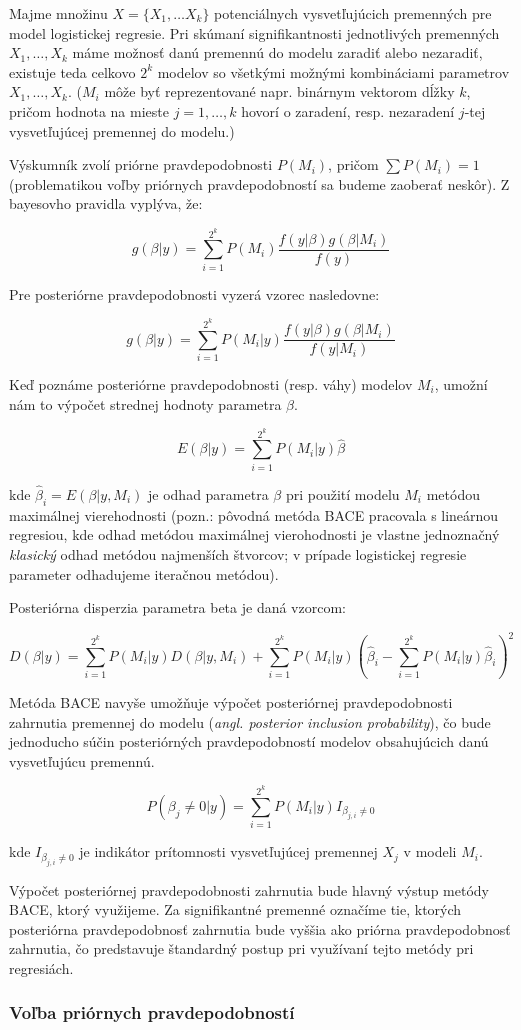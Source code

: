 Majme množinu \( X = \{X_1, \ldots X_k\} \) potenciálnych vysvetľujúcich premenných pre model logistickej regresie.
Pri skúmaní signifikantnosti jednotlivých premenných \( X_1, \ldots, X_k \) máme možnosť danú premennú do modelu zaradiť alebo nezaradiť,
existuje teda celkovo \( 2^k \) modelov so všetkými možnými kombináciami parametrov \( X_1, \ldots, X_k \).
(\( M_i \) môže byť reprezentované napr. binárnym vektorom dĺžky \(k\), pričom hodnota na mieste \( j = 1, \ldots, k \) hovorí o zaradení, resp. nezaradení \(j\)-tej vysvetľujúcej premennej do modelu.)

Výskumník zvolí priórne pravdepodobnosti \( P(M_i) \), pričom \( \sum P(M_i) = 1 \) (problematikou voľby priórnych pravdepodobností sa budeme zaoberať neskôr).
Z bayesovho pravidla vyplýva, že:

\[
    g(\beta | y) = \sum_{i = 1}^{2^k} P(M_i) \frac{f(y | \beta) g(\beta | M_i)}{f(y)}
\]

Pre posteriórne pravdepodobnosti vyzerá vzorec nasledovne:

\[
    g(\beta | y) = \sum_{i = 1}^{2^k} P(M_i | y) \frac{f(y | \beta) g(\beta | M_i)}{f(y | M_i)}
\]

Keď poznáme posteriórne pravdepodobnosti (resp. váhy) modelov \( M_i \), umožní nám to výpočet strednej hodnoty parametra \( \beta \).

\[
    E(\beta | y) = \sum_{i = 1}^{2^k} P(M_i | y) \hat{\beta}
\]

kde \( \hat{\beta}_i = E(\beta |y, M_i) \) je odhad parametra \( \beta \) pri použití modelu \( M_i \) metódou maximálnej vierehodnosti
(pozn.: pôvodná metóda BACE pracovala s lineárnou regresiou, kde odhad metódou maximálnej vierohodnosti je vlastne jednoznačný \emph{klasický} odhad metódou najmenších štvorcov;
v prípade logistickej regresie parameter odhadujeme iteračnou metódou).

Posteriórna disperzia parametra beta je daná vzorcom:

\[
    D(\beta | y) = \sum_{i = 1}^{2^k} P(M_i | y) D(\beta | y, M_i) + \sum_{i = 1}^{2^k} P(M_i | y) \left( \hat{\beta}_i - \sum_{i = 1}^{2^k} P(M_i | y) \hat{\beta}_i \right)^2
\]

Metóda BACE navyše umožňuje výpočet posteriórnej pravdepodobnosti zahrnutia premennej do modelu (\emph{angl. posterior inclusion probability}),
čo bude jednoducho súčin posteriórných pravdepodobností modelov obsahujúcich danú vysvetľujúcu premennú.

\[
    P(\beta_j \neq 0 | y) = \sum_{i = 1}^{2^k} P(M_i | y) I_{\beta_{j, i} \neq 0}
\]

kde \( I_{\beta_{j, i} \neq 0} \) je indikátor prítomnosti vysvetľujúcej premennej \( X_j \) v modeli \( M_i \).

Výpočet posteriórnej pravdepodobnosti zahrnutia bude hlavný výstup metódy BACE, ktorý využijeme.
Za signifikantné premenné označíme tie, ktorých posteriórna pravdepodobnosť zahrnutia bude vyššia ako priórna pravdepodobnosť zahrnutia, čo predstavuje štandardný postup pri využívaní tejto metódy pri regresiách.

\subsubsection{Voľba priórnych pravdepodobností}
